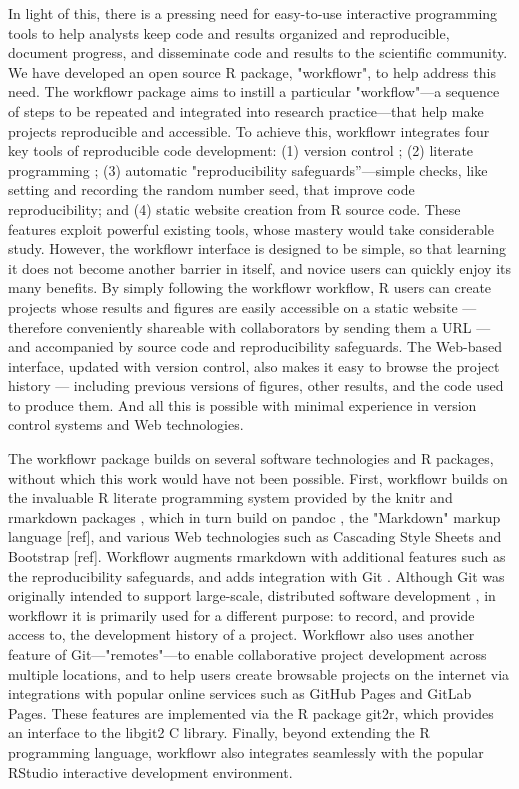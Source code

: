 \documentclass[9pt,a4paper]{extarticle}
\begin{document}
In light of this, there is a pressing need for easy-to-use interactive
programming tools to help analysts keep code and results organized and
reproducible, document progress, and disseminate code and results to the
scientific community. We have developed an open source R \cite{R2019}
package, "workflowr", to help address this need. The workflowr package
aims to instill a particular "workflow"—a sequence of steps to be
repeated and integrated into research practice—that help make projects
reproducible and accessible. To achieve this, workflowr integrates four
key tools of reproducible code development: (1) version control
\cite{Loeliger2012, Chacon2014}; (2) literate programming
\cite{Xie2015}; (3) automatic "reproducibility safeguards”—simple
checks, like setting and recording the random number seed, that improve
code reproducibility; and (4) static website creation from R source
code. These features exploit powerful existing tools, whose mastery
would take considerable study. However, the workflowr interface is
designed to be simple, so that learning it does not become another
barrier in itself, and novice users can quickly enjoy its many benefits.
By simply following the workflowr workflow, R users can create projects
whose results and figures are easily accessible on a static website ---
therefore conveniently shareable with collaborators by sending them a
URL --- and accompanied by source code and reproducibility safeguards.
The Web-based interface, updated with version control, also makes it
easy to browse the project history --- including previous versions of
figures, other results, and the code used to produce them. And all this
is possible with minimal experience in version control systems and Web
technologies.

The workflowr package builds on several software technologies and R
packages, without which this work would have not been possible. First,
workflowr builds on the invaluable R literate programming system
provided by the knitr and rmarkdown packages \cite{}, which in turn
build on pandoc \cite{}, the "Markdown" markup language [ref], and
various Web technologies such as Cascading Style Sheets and Bootstrap
[ref]. Workflowr augments rmarkdown with additional features such as the
reproducibility safeguards, and adds integration with Git \cite{}.
Although Git was originally intended to support large-scale, distributed
software development \cite{}, in workflowr it is primarily used for a
different purpose: to record, and provide access to, the development
history of a project. Workflowr also uses another feature of
Git—"remotes"—to enable collaborative project development across
multiple locations, and to help users create browsable projects on the
internet via integrations with popular online services such as GitHub
Pages and GitLab Pages. These features are implemented via the R package
git2r, which provides an interface to the libgit2 C library. Finally,
beyond extending the R programming language, workflowr also integrates
seamlessly with the popular RStudio interactive development environment.
\end{document}
